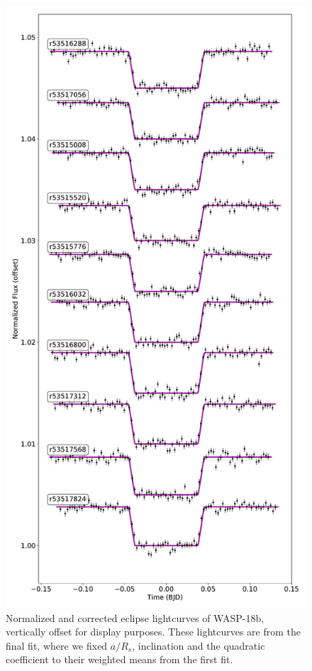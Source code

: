 \begin{figure}
    \centering
    \includegraphics[height=0.8\textheight]{Correctedlightcurves_W18b.pdf}
    \caption{Normalized and corrected eclipse lightcurves of WASP-18b, vertically offset for display purposes. These lightcurves are from the final fit, where we fixed $a/R_s$, inclination and the  quadratic coefficient to their weighted means from the first fit. }
    \label{P3:fig:correctedlcs}
\end{figure}


